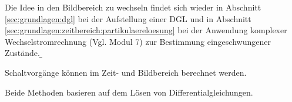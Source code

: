 \begin{frame}
{    Die Idee in den Bildbereich zu wechseln findet sich wieder in Abschnitt \ref{sec:grundlagen:dgl} bei der Aufstellung einer DGL 
    und in Abschnitt \ref{sec:grundlagen:zeitbereich:partikulaereloesung} bei der Anwendung komplexer Wechselstromrechnung (Vgl. Modul 7) zur Bestimmung eingeschwungener Zustände.
}%
\b{%
    Schaltvorgänge können im Zeit- und Bildbereich berechnet werden.
    \begin{center}
    \end{center}
    Beide Methoden basieren auf dem Lösen von Differentialgleichungen.
}%
\end{frame}



